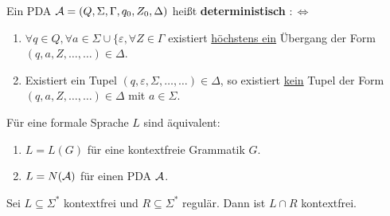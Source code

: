 \begin{definition}\label{def10.5}
	Ein PDA $\mathcal{A}=(Q,\Sigma,\Gamma,q_0,Z_0,\Delta)$ heißt \textbf{deterministisch} $:\Longleftrightarrow$
	\begin{enumerate}
		\item $\forall q\in Q,\forall a\in\Sigma\cup\lbrace\varepsilon,\forall Z\in\Gamma$ existiert \underline{höchstens ein} Übergang der Form\\ $(q,a,Z,\ldots,\ldots)\in\Delta$.
		\item Existiert ein Tupel $(q,\varepsilon,\Sigma,\ldots,\ldots)\in\Delta$, so existiert \underline{kein} Tupel der Form\\ $(q,a,Z,\ldots,\ldots)\in\Delta$ mit $a\in\Sigma$.
	\end{enumerate}
\end{definition}

\begin{satz}\label{satz10.8}
	Für eine formale Sprache $L$ sind äquivalent:
	\begin{enumerate}
		\item $L=L(G)$ für eine kontextfreie Grammatik $G$.
		\item $L=N(\mathcal{A})$ für einen PDA $\mathcal{A}$.
	\end{enumerate}
\end{satz}

\begin{korollar}\label{korollar10.9}
	Sei $L\subseteq\Sigma^\ast$ kontextfrei und $R\subseteq\Sigma^\ast$ regulär.
	Dann ist $L\cap R$ kontextfrei.
\end{korollar}

